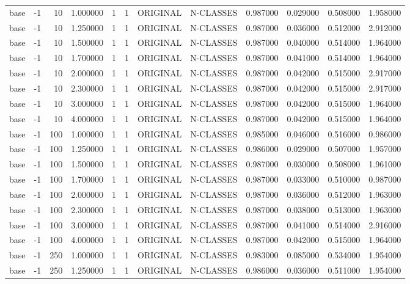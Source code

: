 \begin{tabular}{lrrrllllrrrr}
base & -1 & 10 & 1.000000 & 1 & 1 & ORIGINAL & N-CLASSES & 0.987000 & 0.029000 & 0.508000 & 1.958000 \\
base & -1 & 10 & 1.250000 & 1 & 1 & ORIGINAL & N-CLASSES & 0.987000 & 0.036000 & 0.512000 & 2.912000 \\
base & -1 & 10 & 1.500000 & 1 & 1 & ORIGINAL & N-CLASSES & 0.987000 & 0.040000 & 0.514000 & 1.964000 \\
base & -1 & 10 & 1.700000 & 1 & 1 & ORIGINAL & N-CLASSES & 0.987000 & 0.041000 & 0.514000 & 1.964000 \\
base & -1 & 10 & 2.000000 & 1 & 1 & ORIGINAL & N-CLASSES & 0.987000 & 0.042000 & 0.515000 & 2.917000 \\
base & -1 & 10 & 2.300000 & 1 & 1 & ORIGINAL & N-CLASSES & 0.987000 & 0.042000 & 0.515000 & 2.917000 \\
base & -1 & 10 & 3.000000 & 1 & 1 & ORIGINAL & N-CLASSES & 0.987000 & 0.042000 & 0.515000 & 1.964000 \\
base & -1 & 10 & 4.000000 & 1 & 1 & ORIGINAL & N-CLASSES & 0.987000 & 0.042000 & 0.515000 & 1.964000 \\
base & -1 & 100 & 1.000000 & 1 & 1 & ORIGINAL & N-CLASSES & 0.985000 & 0.046000 & 0.516000 & 0.986000 \\
base & -1 & 100 & 1.250000 & 1 & 1 & ORIGINAL & N-CLASSES & 0.986000 & 0.029000 & 0.507000 & 1.957000 \\
base & -1 & 100 & 1.500000 & 1 & 1 & ORIGINAL & N-CLASSES & 0.987000 & 0.030000 & 0.508000 & 1.961000 \\
base & -1 & 100 & 1.700000 & 1 & 1 & ORIGINAL & N-CLASSES & 0.987000 & 0.033000 & 0.510000 & 0.987000 \\
base & -1 & 100 & 2.000000 & 1 & 1 & ORIGINAL & N-CLASSES & 0.987000 & 0.036000 & 0.512000 & 1.963000 \\
base & -1 & 100 & 2.300000 & 1 & 1 & ORIGINAL & N-CLASSES & 0.987000 & 0.038000 & 0.513000 & 1.963000 \\
base & -1 & 100 & 3.000000 & 1 & 1 & ORIGINAL & N-CLASSES & 0.987000 & 0.041000 & 0.514000 & 2.916000 \\
base & -1 & 100 & 4.000000 & 1 & 1 & ORIGINAL & N-CLASSES & 0.987000 & 0.042000 & 0.515000 & 1.964000 \\
base & -1 & 250 & 1.000000 & 1 & 1 & ORIGINAL & N-CLASSES & 0.983000 & 0.085000 & 0.534000 & 1.954000 \\
base & -1 & 250 & 1.250000 & 1 & 1 & ORIGINAL & N-CLASSES & 0.986000 & 0.036000 & 0.511000 & 1.954000 \\

\end{tabular}
